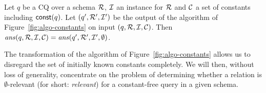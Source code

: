 \begin{proposition}\label{pro:query-constant-elim-equiv}
    Let $q$ be a CQ over a schema $\mathcal{R}$, $\mathcal{I}$ an instance for $\mathcal{R}$ and $\mathcal{C}$ a set of constants including $\mbox{\textsf{const}}(q)$. Let $(q',\mathcal{R}',\mathcal{I}')$ be the output of the algorithm of Figure~\ref{fig:algo-constants} on input $(q,\mathcal{R},\mathcal{I},\mathcal{C})$. Then $\mathit{ans}(q,\mathcal{R},\mathcal{I},\mathcal{C}) = \mathit{ans}(q',\mathcal{R}',\mathcal{I}',\emptyset)$.
\end{proposition}

The transformation of the algorithm of Figure~\ref{fig:algo-constants} allows us to disregard the set of initially known constants completely.
We will then, without loss of generality, concentrate on the problem of determining whether a relation is $\emptyset$-relevant (for short: \emph{relevant}) for a constant-free query in a given schema.

